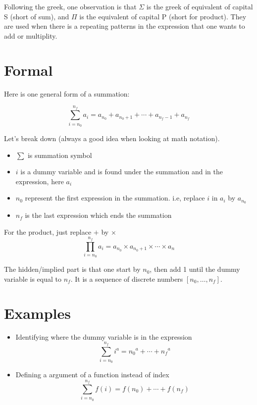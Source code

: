 \documentclass[
  letterpaper,
  DIV=11,
  numbers=noendperiod]{scrreprt}
\providecommand{\tightlist}{%
  \setlength{\itemsep}{0pt}\setlength{\parskip}{0pt}}
\begin{document}
Following the greek, one observation is that \(\Sigma\) is the greek of
equivalent of capital S (short of sum), and \(\Pi\) is the equivalent of
capital P (short for product). They are used when there is a repeating
patterns in the expression that one wants to add or multiplity.

\section*{Formal}\label{formal-3}


Here is one general form of a summation:

\[
\sum_{i = n_0}^{n_f} a_i = a_{n_0} + a_{n_0 + 1} + \cdots + a_{n_f - 1} + a_{n_f}
\]

Let's break down (always a good idea when looking at math notation).

\begin{itemize}
\tightlist
\item
  \(\sum\) is summation symbol
\item
  \(i\) is a dummy variable and is found under the summation and in the
  expression, here \(a_i\)
\item
  \(n_0\) represent the first expression in the summation. i.e, replace
  \(i\) in \(a_i\) by \(a_{n_0}\)
\item
  \(n_f\) is the last expression which ends the summation
\end{itemize}

For the product, just replace \(+\) by \(\times\)
\[\prod_{i = n_0}^{n_f} a_i = a_{n_0} \times a_{n_0 + 1} \times \cdots \times a_n \]

The hidden/implied part is that one start by \(n_0\), then add 1 until
the dummy variable is equal to \(n_f\). It is a sequence of discrete
numbers \([ n_0, \ldots, n_f ]\).

\section*{Examples}\label{examples-3}


\begin{itemize}
\item
  Identifying where the dummy variable is in the expression \[
    \sum_{i = n_0}^{n_f} i^a = {n_0}^a + \cdots + {n_f}^a
  \]
\item
  Defining a argument of a function instead of index \[
    \sum_{i = n_0}^{n_f} f(i) = f(n_0) + \cdots + f(n_f)
  \]
\end{itemize}
\end{document}
